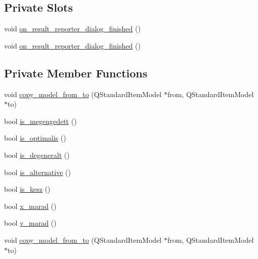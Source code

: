 \subsection*{Private Slots}
\begin{DoxyCompactItemize}
\item 
void \hyperlink{classresult__reporter__dialog_a44fa6d948ee0119ea33c9581b3047463}{on\+\_\+result\+\_\+reporter\+\_\+dialog\+\_\+finished} ()
\item 
void \hyperlink{classresult__reporter__dialog_a44fa6d948ee0119ea33c9581b3047463}{on\+\_\+result\+\_\+reporter\+\_\+dialog\+\_\+finished} ()
\end{DoxyCompactItemize}
\subsection*{Private Member Functions}
\begin{DoxyCompactItemize}
\item 
void \hyperlink{classresult__reporter__dialog_a86515b41e90e3566c244ef609237ae92}{copy\+\_\+model\+\_\+from\+\_\+to} (Q\+Standard\+Item\+Model $\ast$from, Q\+Standard\+Item\+Model $\ast$to)
\item 
bool \hyperlink{classresult__reporter__dialog_ae2edb766d3140ac31714c6bca7522177}{is\+\_\+megengedett} ()
\item 
bool \hyperlink{classresult__reporter__dialog_a8a8acd3370d0fb4a8a3233f90988edd2}{is\+\_\+optimalis} ()
\item 
bool \hyperlink{classresult__reporter__dialog_acd982d3fb89f9d533015850dfc952439}{is\+\_\+degeneralt} ()
\item 
bool \hyperlink{classresult__reporter__dialog_a81b094141eb2eac2fb683f77eb78dd75}{is\+\_\+alternative} ()
\item 
bool \hyperlink{classresult__reporter__dialog_aa01c9e3700c0ad800faaa1e1e7e27cda}{is\+\_\+kesz} ()
\item 
bool \hyperlink{classresult__reporter__dialog_a1c5c814b57242606e724258c49b8fb47}{x\+\_\+marad} ()
\item 
bool \hyperlink{classresult__reporter__dialog_a4f4f6760697c697cdeef2a3103f9a0d9}{v\+\_\+marad} ()
\item 
void \hyperlink{classresult__reporter__dialog_a86515b41e90e3566c244ef609237ae92}{copy\+\_\+model\+\_\+from\+\_\+to} (Q\+Standard\+Item\+Model $\ast$from, Q\+Standard\+Item\+Model $\ast$to)
\end{DoxyCompactItemize}
